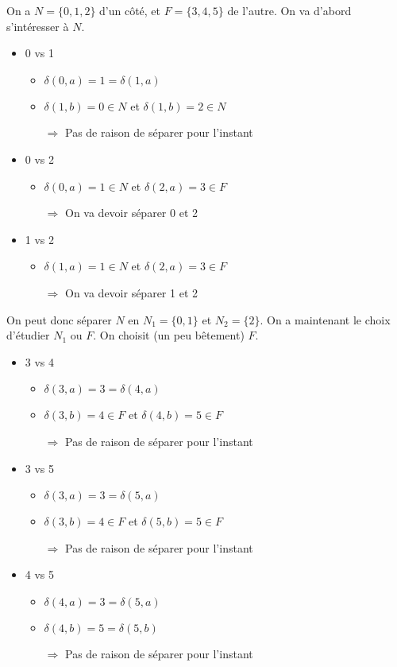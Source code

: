 \begin{correction*}

On a $N = \{0,1,2\}$ d'un côté, et $F = \{3,4,5\}$ de l'autre. On va d'abord s'intéresser à $N$.

\begin{itemize}
\item 0 vs 1
\begin{itemize}
\item $\delta(0,a) = 1 = \delta(1,a)$
\item $\delta(1,b) = 0 \in N$ et $\delta(1,b) = 2 \in N$
\item[$\Rightarrow$] Pas de raison de séparer pour l'instant
\end{itemize}
\item 0 vs 2
\begin{itemize}
\item $\delta(0,a) = 1 \in N$ et $\delta(2,a) = 3 \in F$
\item[$\Rightarrow$] On va devoir séparer 0 et 2
\end{itemize}
\item 1 vs 2
\begin{itemize}
\item $\delta(1,a) = 1 \in N$ et $\delta(2,a) = 3 \in F$
\item[$\Rightarrow$] On va devoir séparer 1 et 2
\end{itemize}
\end{itemize}

On peut donc séparer $N$ en $N_1 = \{0,1\}$ et $N_2 = \{2\}$. On a maintenant le choix d'étudier $N_1$ ou $F$. On choisit (un peu bêtement) $F$.

\begin{itemize}
\item 3 vs 4
\begin{itemize}
\item $\delta(3,a) = 3 = \delta(4,a)$
\item $\delta(3,b) = 4 \in F$ et $\delta(4,b) = 5 \in F$
\item[$\Rightarrow$] Pas de raison de séparer pour l'instant
\end{itemize}
\item 3 vs 5
\begin{itemize}
\item $\delta(3,a) = 3 = \delta(5,a)$
\item $\delta(3,b) = 4 \in F$ et $\delta(5,b) = 5 \in F$
\item[$\Rightarrow$] Pas de raison de séparer pour l'instant
\end{itemize}
\item 4 vs 5
\begin{itemize}
\item $\delta(4,a) = 3 = \delta(5,a)$
\item $\delta(4,b) = 5 = \delta(5,b)$
\item[$\Rightarrow$] Pas de raison de séparer pour l'instant
\end{itemize}\end{itemize}


\end{correction*}
